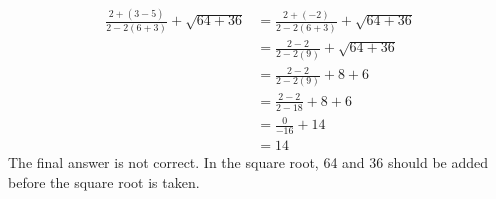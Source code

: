 {\begin{equation*}
	\begin{split}
		\frac{2+(3-5)}{2-2(6+3)} + \sqrt{64+36} & = \frac{2+(-2)}{2-2(6+3)} + \sqrt{64+36} \\
							& = \frac{2-2}{2-2(9)} + \sqrt{64+36} \\
							& = \frac{2-2}{2-2(9)} + 8+6 \\
							& = \frac{2-2}{2-18} +8 + 6 \\
							& = \frac{0}{-16} + 14 \\
							& = 14
	\end{split}
\end{equation*} }
{The final answer is not correct. In the square root, 64 and 36 should be added before the square root is taken.}
